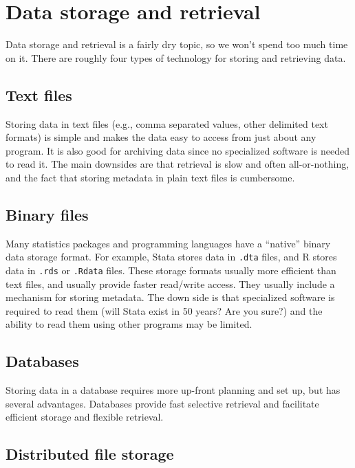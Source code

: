 \documentclass[]{book}
\begin{document}
\section{Data storage and retrieval}\label{data-storage-and-retrieval}

Data storage and retrieval is a fairly dry topic, so we won't spend too
much time on it. There are roughly four types of technology for storing
and retrieving data.

\subsection{Text files}\label{text-files}

Storing data in text files (e.g., comma separated values, other
delimited text formats) is simple and makes the data easy to access from
just about any program. It is also good for archiving data since no
specialized software is needed to read it. The main downsides are that
retrieval is slow and often all-or-nothing, and the fact that storing
metadata in plain text files is cumbersome.

\subsection{Binary files}\label{binary-files}

Many statistics packages and programming languages have a ``native''
binary data storage format. For example, Stata stores data in
\texttt{.dta} files, and R stores data in \texttt{.rds} or
\texttt{.Rdata} files. These storage formats usually more efficient than
text files, and usually provide faster read/write access. They usually
include a mechanism for storing metadata. The down side is that
specialized software is required to read them (will Stata exist in 50
years? Are you sure?) and the ability to read them using other programs
may be limited.

\subsection{Databases}\label{databases}

Storing data in a database requires more up-front planning and set up,
but has several advantages. Databases provide fast selective retrieval
and facilitate efficient storage and flexible retrieval.

\subsection{Distributed file storage}\label{distributed-file-storage}
\end{document}
